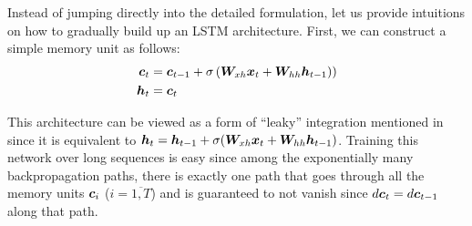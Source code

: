 Instead of jumping directly into the detailed formulation, let us provide intuitions
on how to gradually build up an LSTM architecture. First, we can construct a
simple memory unit as follows:
\begin{align}
\bm{c}_{t} &= \bm{c}_{t-1} + \sigma\left(\bm{W}_{xh}\bm{x}_{t} + \bm{W}_{hh}\bm{h}_{t-1}\right)
\label{e:simple_mem}) \\
\bm{h}_{t} &= \bm{c}_{t}
\end{align}

This architecture can be viewed as a form of ``leaky'' integration 
mentioned in \cite{sutskever12,bengio13} since it is equivalent to $\bm{h}_{t} =
\bm{h}_{t-1} + \sigma(\bm{W}_{xh}\bm{x}_{t} + \bm{W}_{hh}\bm{h}_{t-1})$. Training this
network over long sequences is easy since among the exponentially many backpropagation
paths, there is exactly one path that goes through all the memory units
$\bm{c}_{i}$ ($i=\overline{1,T}$) and is
guaranteed to not vanish since $d\bm{c}_{t} = d\bm{c}_{t-1}$ along that path. 

